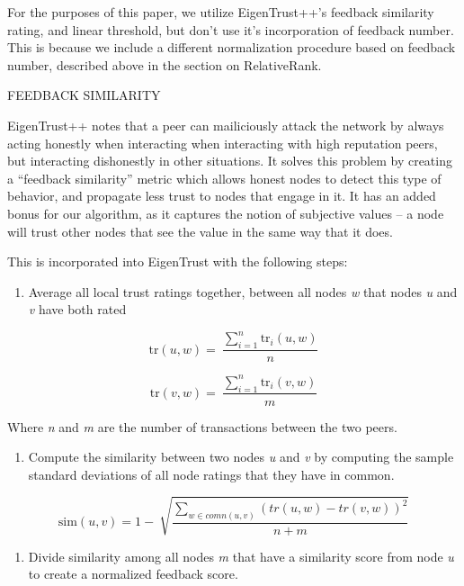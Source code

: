 For the purposes of this paper, we utilize EigenTrust++'s feedback
similarity rating, and linear threshold, but don't use it's
incorporation of feedback number. This is because we include a different
normalization procedure based on feedback number, described above in the
section on RelativeRank.

FEEDBACK SIMILARITY

EigenTrust++ notes that a peer can mailiciously attack the network by
always acting honestly when interacting when interacting with high
reputation peers, but interacting dishonestly in other situations. It
solves this problem by creating a ``feedback similarity'' metric which
allows honest nodes to detect this type of behavior, and propagate less
trust to nodes that engage in it. It has an added bonus for our
algorithm, as it captures the notion of subjective values -- a node will
trust other nodes that see the value in the same way that it does.

This is incorporated into EigenTrust with the following steps:

\begin{enumerate}
\def\labelenumi{\arabic{enumi}.}
\item
  Average all local trust ratings together, between all nodes \emph{w}
  that nodes \emph{u} and \emph{v} have both rated
\end{enumerate}

\[\text{tr}\left( u,w \right) = \ \frac{\sum_{i = 1}^{n}{\text{tr}_{i}(u,w)}}{n}\]

\[\text{tr}\left( v,w \right) = \ \frac{\sum_{i = 1}^{n}{\text{tr}_{i}(v,w)}}{m}\]

Where \emph{n} and \emph{m} are the number of transactions between the
two peers.

\begin{enumerate}
\def\labelenumi{\arabic{enumi}.}
\item
  Compute the similarity between two nodes \emph{u} and \emph{v} by
  computing the sample standard deviations of all node ratings that they
  have in common.
\end{enumerate}

\[\text{sim}\left( u,v \right) = 1 - \ \sqrt{\frac{\sum_{w \in comn(u,v)}^{}{(tr\left( u,w \right) - tr\left( v,w \right))}^{2}}{n + m}}\]

\begin{enumerate}
\def\labelenumi{\arabic{enumi}.}
\item
  \protect\hypertarget{_1tg0egos6sa6}{}{}Divide similarity among all
  nodes \emph{m} that have a similarity score from node \emph{u} to
  create a normalized feedback score.
\end{enumerate}

